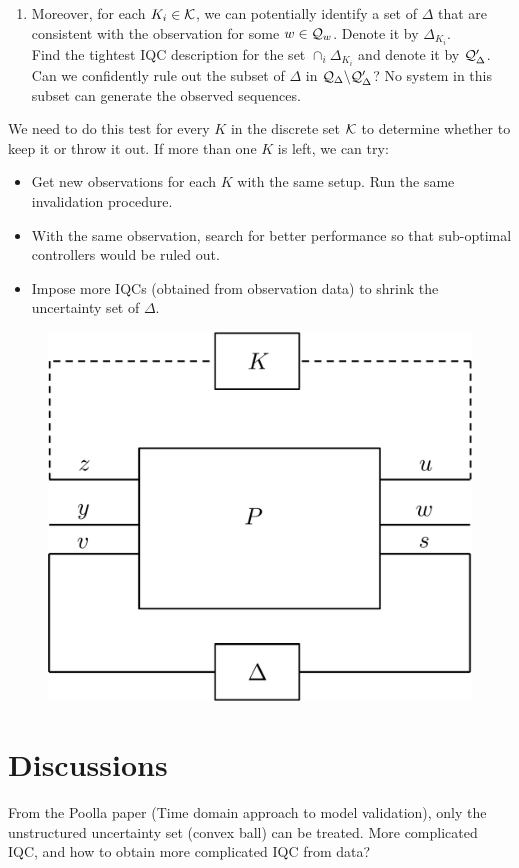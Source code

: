 \documentclass[11pt, onecolumn]{article}
\begin{document}
\begin{enumerate}
\item Moreover, for each $K_i\in\mathcal K$, we can potentially identify a set of $\Delta$ that are
  consistent with the observation for some $w\in\mathcal Q_{w}$. Denote it by $\Delta_{K_i}$.
  \\
  Find the tightest IQC description for the set $\cap_i \Delta_{K_i}$ and denote it by $\mathcal
  Q_{\Delta}'$.  Can we confidently rule out the subset of $\Delta$ in $\mathcal Q_{\Delta} \backslash
  \mathcal Q_{\Delta}'$?  No system in this subset can generate the observed sequences.

\end{enumerate}

We need to do this test for every $K$ in the discrete set $\mathcal K$ to determine whether to keep it or
throw it out. If more than one $K$ is left, we can try:
\begin{itemize}
\item Get new observations for each $K$ with the same setup. Run the same invalidation procedure.
\item With the same observation, search for better performance so that sub-optimal controllers would
  be ruled out.
\item Impose more IQCs (obtained from observation data) to shrink the uncertainty set of $\Delta$.
\end{itemize}



\begin{figure}[h!]
  \centering
  \includegraphics[width=.4\linewidth]{sys1.pdf}
\end{figure}




\section{Discussions}

From the Poolla paper (Time domain approach to model validation), only the unstructured uncertainty
set (convex ball) can be treated. More complicated IQC, and how to obtain more complicated IQC from data?
\end{document}
